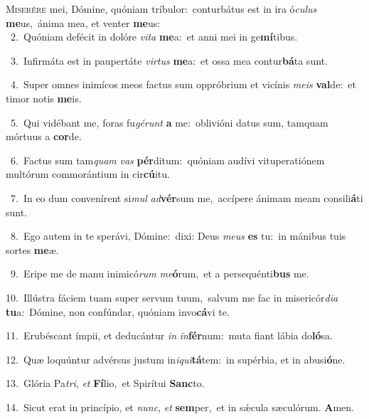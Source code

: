 \lettrine{\initial\textcolor{\initialcolor}{M}}{iserére} mei, Dómine, quóniam tríbulor:~\dagger conturbátus est in ira ó\-\textit{cu}\-\textit{lus} \textbf{me}\-us,~\star ánima mea, et venter \textbf{me}\-us:\\
{\numbfont\textcolor{\numbcolor}{~2.}}~Quóniam defécit in dolóre \textit{vi}\-\textit{ta} \textbf{me}\-a:~\star et anni mei in ge\-\textbf{mí}\-tibus.\par
{\numbfont\textcolor{\numbcolor}{~3.}}~Infirmáta est in paupertáte \textit{vir}\-\textit{tus} \textbf{me}\-a:~\star et ossa mea contur\-\textbf{bá}\-ta sunt.\par
{\numbfont\textcolor{\numbcolor}{~4.}}~Super omnes inimícos meos factus sum oppróbrium et vicínis \textit{me}\-\textit{is} \textbf{val}\-de:~\star et timor notis \textbf{me}\-is.\par
{\numbfont\textcolor{\numbcolor}{~5.}}~Qui vidébant me, foras fu\-\textit{gé}\-\textit{runt} \textbf{a} me:~\star oblivióni datus sum, tamquam mórtuus a \textbf{cor}\-de.\par
{\numbfont\textcolor{\numbcolor}{~6.}}~Factus sum tam\textit{quam} \textit{vas} \textbf{pér}\-ditum:~\star quóniam audívi vituperatiónem multórum commorántium in cir\-\textbf{cú}\-itu.\par
{\numbfont\textcolor{\numbcolor}{~7.}}~In eo dum convenírent si\textit{mul} \textit{ad}\-\textbf{vér}sum me,~\star accípere ánimam meam consili\-\textbf{á}\-ti sunt.\par
{\numbfont\textcolor{\numbcolor}{~8.}}~Ego autem in te sperávi, Dómine:~\dagger dixi: Deus \textit{me}\-\textit{us} \textbf{es} tu:~\star in mánibus tuis sortes \textbf{me}\-æ.\par
{\numbfont\textcolor{\numbcolor}{~9.}}~Eripe me de manu inimicó\textit{rum} \textit{me}\-\textbf{ó}rum,~\star et a persequénti\textbf{bus} me.\par
{\numbfont\textcolor{\numbcolor}{10.}}~Illústra fáciem tuam super servum tuum,~\dagger salvum me fac in misericór\-\textit{di}\-\textit{a} \textbf{tu}\-a:~\star Dómine, non confúndar, quóniam invo\-\textbf{cá}\-vi te.\par
{\numbfont\textcolor{\numbcolor}{11.}}~Erubéscant ímpii, et deducántur \textit{in} \textit{in}\-\textbf{fér}num:~\star muta fiant lábia do\-\textbf{ló}\-sa.\par
{\numbfont\textcolor{\numbcolor}{12.}}~Quæ loquúntur advérsus justum in\-\textit{i}\-\textit{qui}\textbf{tá}tem:~\star in supérbia, et in abusi\-\textbf{ó}\-ne.\par
{\numbfont\textcolor{\numbcolor}{13.}}~Glória Pa\-\textit{tri}\-, \textit{et} \textbf{Fí}\-lio,~\star et Spirítui \textbf{Sanc}\-to.\par
{\numbfont\textcolor{\numbcolor}{14.}}~Sicut erat in princípio, et \textit{nunc}\-, \textit{et} \textbf{sem}\-per,~\star et in sǽcula sæculórum. \textbf{A}\-men.\par
